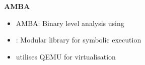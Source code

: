 \begin{frame}

	\begin{columns}[t]
		\begin{column}{0.6\textwidth}
			\textbf{AMBA}
			\small
			\begin{itemize}
                \item AMBA: Binary level analysis using \stoe{}
				\item \stoe{}: Modular library for symbolic execution
				\item utilises QEMU for virtualisation
    
			\end{itemize}
		\end{column}
	\end{columns}
\end{frame}
